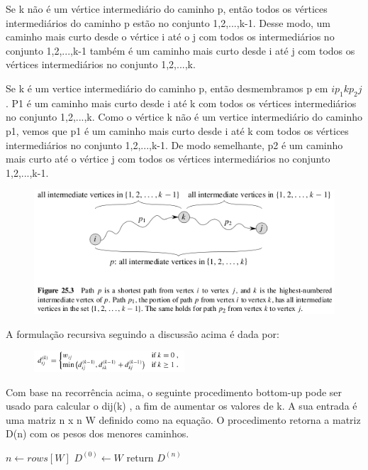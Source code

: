 \documentclass[a4paper,12pt]{article}
\begin{document}
Se k não é um vértice intermediário do caminho p, então todos os vértices intermediários do caminho p estão no conjunto {1,2,...,k-1}. Desse modo, um caminho mais curto desde o vértice i até o j com todos os intermediários no conjunto {1,2,...,k-1} também é um caminho mais curto desde i até j com todos os vértices intermediários no conjunto {1,2,...,k}.

Se k é um vertice intermediário do caminho p, então desmembramos p em $ip_1kp_2j$. P1 é um caminho mais curto desde i até k com todos os vértices intermediários no conjunto {1,2,...,k}. Como o vértice k não é um vertice intermediário do caminho p1, vemos que p1 é um caminho mais curto desde i até k com todos os vértices intermediários no conjunto {1,2,...,k-1}. De modo semelhante, p2 é um caminho mais curto até o vértice j com todos os vértices intermediários no conjunto {1,2,...,k-1}.

\begin{figure}[h!]
	\centering
	\includegraphics[width=1.0\textwidth]{djikstra}
	\label{fig:djikstra}
\end{figure}

A formulação recursiva seguindo a discussão acima é dada por:

\begin{figure}[h!]
	\centering
	\includegraphics[width=0.5\textwidth]{djikstra2}
	\label{fig:djistra_pd}
\end{figure}

Com base na recorrência acima, o  seguinte procedimento bottom-up  pode ser usado para calcular o dij(k) , a fim de aumentar os valores de k. A sua entrada é uma matriz n x n W definido como na equação. O procedimento retorna a matriz D(n) com os pesos dos menores caminhos.

\begin{algorithm}
$ n \gets rows[W]$\;
$ D^(0) \gets W$\;
return $D^(n)$\;
\end{algorithm}
\end{document}
